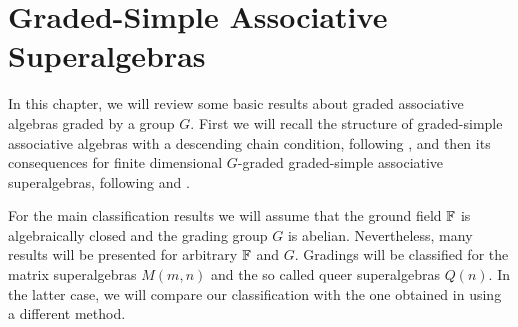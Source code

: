 \chapter{Graded-Simple Associative Superalgebras}\label{chap:grd-simple-assc}

In this chapter, we will review some basic results about graded associative algebras graded by a group $G$.
First we will recall the structure of graded-simple associative algebras with a descending chain condition, following \cite{livromicha}, and then its consequences for finite dimensional $G$-graded graded-simple associative superalgebras, following \cite{paper-MAP} and \cite{Helens_thesis}. 

For the main classification results we will assume that the ground field $\mathbb{F}$ is algebraically closed and the grading group $G$ is abelian. 
Nevertheless, many results will be presented for arbitrary $\mathbb{F}$ and $G$. 
Gradings will be classified for the matrix superalgebras $M(m,n)$ and the so called queer superalgebras $Q(n)$. 
In the latter case, we will compare our classification with the one obtained in \cite{paper-Qn} using a different method.






